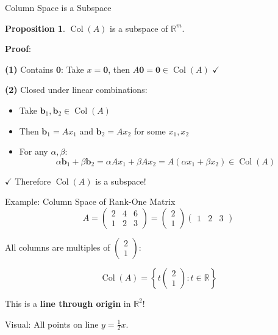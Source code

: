 \documentclass[10pt]{beamer}
\theoremstyle{definition}
\newtheorem{prop}{Proposition}[section]
\newcommand{\x}[1]{\alert{\textbf{#1}}}
\begin{document}
\begin{frame}{Column Space is a Subspace}
\begin{prop}
$\operatorname{Col}(A)$ is a subspace of $\mathbb{R}^m$.
\end{prop}

\vfill
\textbf{Proof}:

\textbf{(1)} Contains $\mathbf{0}$: Take $x = \mathbf{0}$, then $A\mathbf{0} = \mathbf{0} \in \operatorname{Col}(A)$ $\checkmark$

\vfill
\textbf{(2)} Closed under linear combinations:
\begin{itemize}
\item Take $\mathbf{b}_1, \mathbf{b}_2 \in \operatorname{Col}(A)$
\item Then $\mathbf{b}_1 = Ax_1$ and $\mathbf{b}_2 = Ax_2$ for some $x_1, x_2$
\item For any $\alpha, \beta$:
$$\alpha\mathbf{b}_1 + \beta\mathbf{b}_2 = \alpha Ax_1 + \beta Ax_2 = A(\alpha x_1 + \beta x_2) \in \operatorname{Col}(A)$$
\end{itemize}

$\checkmark$ Therefore $\operatorname{Col}(A)$ is a subspace!
\end{frame}

\begin{frame}{Example: Column Space of Rank-One Matrix}
$$A = \begin{pmatrix} 2 & 4 & 6 \\ 1 & 2 & 3 \end{pmatrix} = \begin{pmatrix} 2 \\ 1 \end{pmatrix} \begin{pmatrix} 1 & 2 & 3 \end{pmatrix}$$

\vfill
All columns are multiples of $\begin{pmatrix} 2 \\ 1 \end{pmatrix}$:

$$\operatorname{Col}(A) = \left\{ t \begin{pmatrix} 2 \\ 1 \end{pmatrix} : t \in \mathbb{R} \right\}$$

\vfill
This is a \x{line through origin} in $\mathbb{R}^2$!

\vfill
Visual: All points on line $y = \frac{1}{2}x$.
\end{frame}
\end{document}
